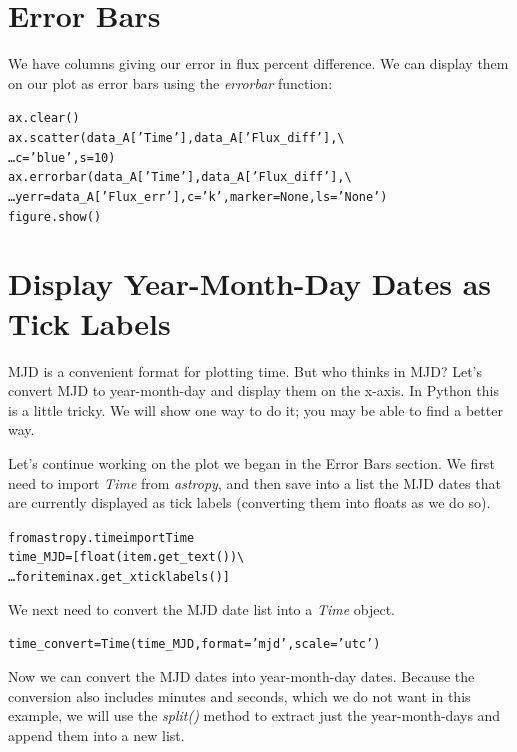 
\section{Error Bars}\label{s:error_bars}

We have columns giving our error in flux percent difference. We can display them on our plot as
error bars using the \textit{errorbar} function:

\begin{alltt}
\pytab ax.clear()
\pytab ax.scatter(data_A['Time'], data_A['Flux_diff'], \textbackslash
\ldots c='blue', s=10)
\pytab ax.errorbar(data_A['Time'], data_A['Flux_diff'], \textbackslash 
\ldots yerr=data_A['Flux_err'], c='k', marker=None, ls='None')
\pytab figure.show()
\end{alltt}

\section{Display Year-Month-Day Dates as Tick Labels}\label{s:dates}

MJD is a convenient format for plotting time. But who 
thinks in MJD? Let's convert MJD to year-month-day and display them 
on the x-axis. In Python this is a little tricky. We will show one way to do
it; you may be able to find a better way.

Let's continue working on the plot we began in the Error Bars section.
We first need to import \textit{Time} from \textit{astropy}, and then save
into a list the MJD dates that are currently displayed as tick labels (converting them into
floats as we do so).

\begin{alltt}
\pytab from astropy.time import Time
\pytab time\_MJD = [float(item.get\_text()) \textbackslash
\ldots for item in ax.get\_xticklabels()]
\end{alltt}

We next need to convert the MJD date list into a \textit{Time} object. 

\begin{alltt}
\pytab time\_convert = Time(time\_MJD, format='mjd', scale='utc')
\end{alltt}

Now we can convert the MJD dates into year-month-day dates. Because
the conversion also includes minutes and seconds, which we do not want
in this example, we will use the \textit{split()} method to extract just the 
year-month-days and append them into a new list. 

